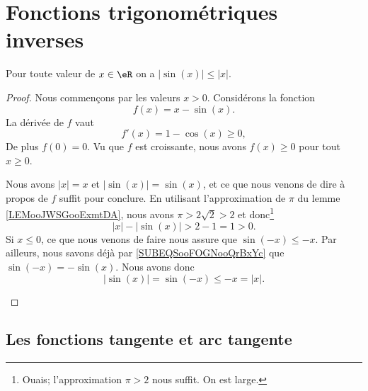 \section{Fonctions trigonométriques inverses}


\begin{lemma}       \label{LEMooIECUooQOGYyN}
	Pour toute valeur de \( x\in \eR\) on a \( |\sin(x)|\leq |x|\).
\end{lemma}

\begin{proof}
	Nous commençons par les valeurs \( x>0\). Considérons la fonction
	\begin{equation}
		f(x)=x-\sin(x).
	\end{equation}
	La dérivée de \( f\) vaut
	\begin{equation}
		f'(x)=1-\cos(x)\geq 0,
	\end{equation}
	De plus \( f(0)=0\). Vu que \( f\) est croissante, nous avons \( f(x)\geq 0\) pour tout \( x\geq 0\).

	\begin{subproof}
		Nous avons \(| x |=x\) et \( | \sin(x) |=\sin(x)\), et ce que nous venons de dire à propos de \( f\) suffit pour conclure.
		En utilisant l'approximation de \( \pi\) du lemme \ref{LEMooJWSGooExmtDA}, nous avons \( \pi>2\sqrt{ 2 }>2\) et donc\footnote{Ouais; l'approximation \( \pi>2\) nous suffit. On est large.}
		\begin{equation}
			| x |-| \sin(x) |>2-1=1>0.
		\end{equation}
		\spitem[Pour \( x<0\)]
		Si \( x\leq 0\), ce que nous venons de faire nous assure que \( \sin(-x)\leq -x\). Par ailleurs, nous savons déjà par \eqref{SUBEQSooFOGNooQrBxYc} que \( \sin(-x)=-\sin(x)\). Nous avons donc
		\begin{equation}
			| \sin(x) |=\sin(-x)\leq -x=| x |.
		\end{equation}
	\end{subproof}
\end{proof}


\subsection{Les fonctions tangente et arc tangente}

